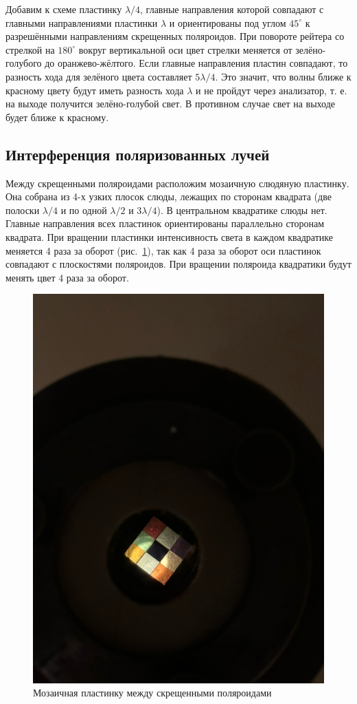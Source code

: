 \documentclass[a4paper, 12pt]{article}
\begin{document}
Добавим к схеме пластинку $\lambda/4$, главные направления которой совпадают с главными направлениями пластинки $\lambda$ и ориентированы под углом $45^{\circ}$ к разрешёнными направлениям скрещенных поляроидов. При повороте рейтера со стрелкой на $180^{\circ}$ вокруг вертикальной оси цвет стрелки меняется от зелёно-голубого до оранжево-жёлтого. Если главные направления пластин совпадают, то разность хода для зелёного цвета составляет $5\lambda/4$. Это значит, что волны ближе к красному цвету будут иметь разность хода $\lambda$ и не пройдут через анализатор, т. е. на выходе получится зелёно-голубой свет. В противном случае свет на выходе будет ближе к красному.

\newpage

\subsection{Интерференция поляризованных лучей}

Между скрещенными поляроидами расположим мозаичную слюдяную пластинку. Она собрана из 4-х узких плосок слюды, лежащих по сторонам квадрата (две полоски $\lambda/4$ и по одной $\lambda/2$ и $3\lambda/4$). В центральном квадратике слюды нет. Главные направления всех пластинок ориентированы параллельно сторонам квадрата. При вращении пластинки интенсивность света в каждом квадратике меняется 4 раза за оборот (рис.~\ref{fig:mosaic}), так как 4 раза за оборот оси пластинок совпадают с плоскостями поляроидов. При вращении поляроида квадратики будут менять цвет 4 раза за оборот.

\begin{figure}[h!]
\begin{center}
   \includegraphics[width=0.5\linewidth]{mosaic.jpg}
\end{center}
\caption{Мозаичная пластинку между скрещенными поляроидами}
\label{fig:mosaic}
\end{figure}
\end{document}
